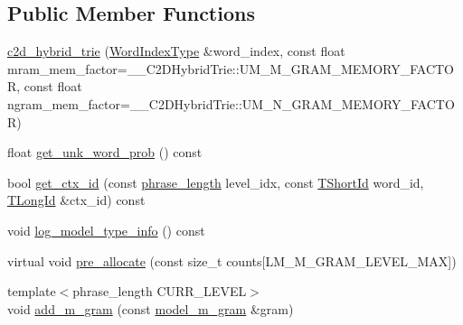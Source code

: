 \subsection*{Public Member Functions}
\begin{DoxyCompactItemize}
\item 
\hyperlink{classuva_1_1smt_1_1bpbd_1_1server_1_1lm_1_1c2d__hybrid__trie_aff66fd60349c736cb01d174e0fa03012}{c2d\+\_\+hybrid\+\_\+trie} (\hyperlink{classuva_1_1smt_1_1bpbd_1_1server_1_1lm_1_1word__index__trie__base_a64279b5b94c421b25aedaa72e73d013c}{Word\+Index\+Type} \&word\+\_\+index, const float mram\+\_\+mem\+\_\+factor=\+\_\+\+\_\+\+C2\+D\+Hybrid\+Trie\+::\+U\+M\+\_\+\+M\+\_\+\+G\+R\+A\+M\+\_\+\+M\+E\+M\+O\+R\+Y\+\_\+\+F\+A\+C\+T\+O\+R, const float ngram\+\_\+mem\+\_\+factor=\+\_\+\+\_\+\+C2\+D\+Hybrid\+Trie\+::\+U\+M\+\_\+\+N\+\_\+\+G\+R\+A\+M\+\_\+\+M\+E\+M\+O\+R\+Y\+\_\+\+F\+A\+C\+T\+O\+R)
\item 
float \hyperlink{classuva_1_1smt_1_1bpbd_1_1server_1_1lm_1_1c2d__hybrid__trie_a6fbade01c751b9aad7a68c5bf6d89fa0}{get\+\_\+unk\+\_\+word\+\_\+prob} () const 
\item 
bool \hyperlink{classuva_1_1smt_1_1bpbd_1_1server_1_1lm_1_1c2d__hybrid__trie_addd22f92aeede7ce386220ff337a49a8}{get\+\_\+ctx\+\_\+id} (const \hyperlink{namespaceuva_1_1smt_1_1bpbd_1_1server_af068a19c2e03116caf3e3827a3e40e35}{phrase\+\_\+length} level\+\_\+idx, const \hyperlink{namespaceuva_1_1smt_1_1bpbd_1_1server_1_1lm_1_1identifiers_a33043a191e9a637dea742a89d23c8bdc}{T\+Short\+Id} word\+\_\+id, \hyperlink{namespaceuva_1_1smt_1_1bpbd_1_1server_1_1lm_1_1identifiers_a6841847096e455ad3c38689bc548b3b0}{T\+Long\+Id} \&ctx\+\_\+id) const 
\item 
void \hyperlink{classuva_1_1smt_1_1bpbd_1_1server_1_1lm_1_1c2d__hybrid__trie_a99fe5132543d473c4ca14dea0948bcc1}{log\+\_\+model\+\_\+type\+\_\+info} () const 
\item 
virtual void \hyperlink{classuva_1_1smt_1_1bpbd_1_1server_1_1lm_1_1c2d__hybrid__trie_a2f8aa68ca3dacec8305e013f86ec0309}{pre\+\_\+allocate} (const size\+\_\+t counts\mbox{[}L\+M\+\_\+\+M\+\_\+\+G\+R\+A\+M\+\_\+\+L\+E\+V\+E\+L\+\_\+\+M\+A\+X\mbox{]})
\item 
{\footnotesize template$<$phrase\+\_\+length C\+U\+R\+R\+\_\+\+L\+E\+V\+E\+L$>$ }\\void \hyperlink{classuva_1_1smt_1_1bpbd_1_1server_1_1lm_1_1c2d__hybrid__trie_a28f35c4cf258faf8f7b78afcb4919dce}{add\+\_\+m\+\_\+gram} (const \hyperlink{classuva_1_1smt_1_1bpbd_1_1server_1_1lm_1_1m__grams_1_1model__m__gram}{model\+\_\+m\+\_\+gram} \&gram)

\end{DoxyCompactItemize}

